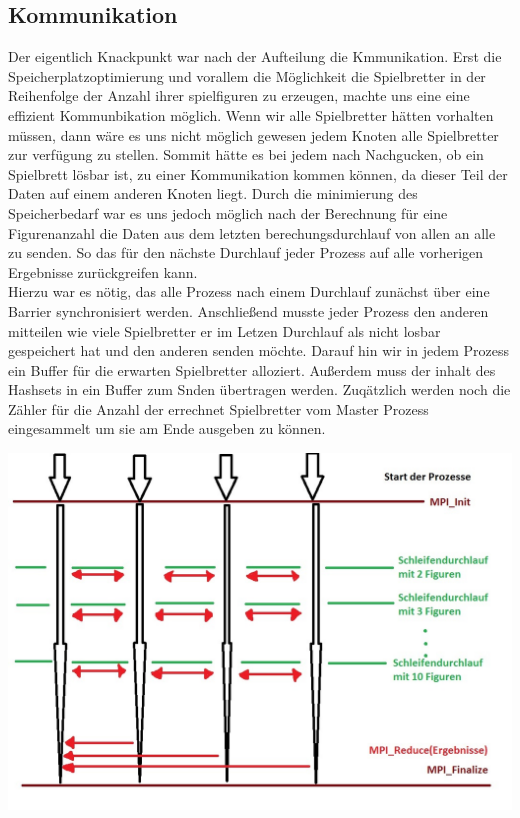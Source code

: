 \documentclass[
	12pt,
	a4paper,
	BCOR10mm,
	DIV14,
	listof=totoc,
	bibliography=totoc,
	headsepline
]{scrreprt}
\begin{document}
\subsection{Kommunikation}
Der eigentlich Knackpunkt war nach der Aufteilung die Kmmunikation. Erst die Speicherplatzoptimierung und vorallem die Möglichkeit die Spielbretter in der Reihenfolge der Anzahl ihrer spielfiguren zu erzeugen, machte uns eine eine effizient Kommunbikation möglich.
Wenn wir alle Spielbretter hätten vorhalten müssen, dann wäre es uns nicht möglich gewesen jedem Knoten alle Spielbretter zur verfügung zu stellen. Sommit hätte es bei jedem nach Nachgucken, ob ein Spielbrett lösbar ist, zu einer Kommunikation kommen können, da dieser Teil der Daten auf einem anderen Knoten liegt. Durch die minimierung des Speicherbedarf war es uns jedoch möglich nach der Berechnung für eine Figurenanzahl die Daten aus dem letzten berechungsdurchlauf von allen an alle zu senden. So das für den nächste Durchlauf jeder Prozess auf alle vorherigen Ergebnisse zurückgreifen kann.  \\
Hierzu war es nötig, das alle Prozess nach einem Durchlauf zunächst über eine Barrier synchronisiert werden. Anschließend musste jeder Prozess den anderen mitteilen wie viele Spielbretter er im Letzen Durchlauf als nicht losbar gespeichert hat und den anderen senden möchte. Darauf hin wir in jedem Prozess ein Buffer für die erwarten Spielbretter alloziert. Außerdem muss der inhalt des Hashsets in ein Buffer zum Snden übertragen werden.
Zuqätzlich werden noch die Zähler für die Anzahl der errechnet Spielbretter vom Master Prozess eingesammelt um sie am Ende ausgeben zu können.
 
\includegraphics[scale=0.6]{MPI_Kommunikation}
\end{document}
